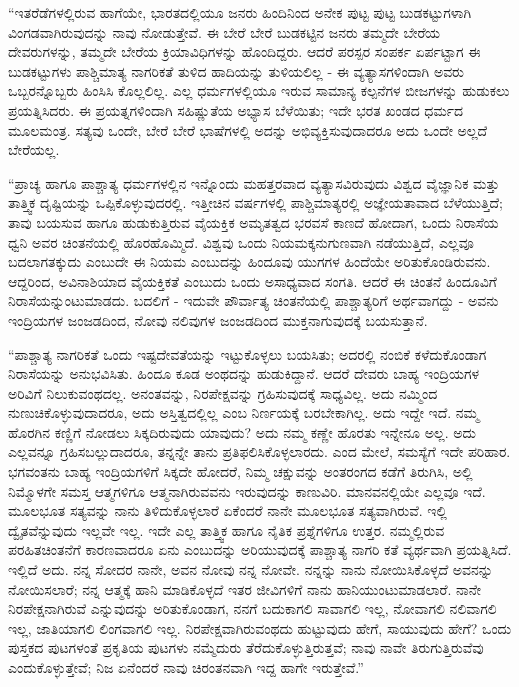 “ಇತರೆಡೆಗಳಲ್ಲಿರುವ ಹಾಗೆಯೇ, ಭಾರತದಲ್ಲಿಯೂ ಜನರು ಹಿಂದಿನಿಂದ ಅನೇಕ ಪುಟ್ಟ ಪುಟ್ಟ ಬುಡಕಟ್ಟುಗಳಾಗಿ ವಿಂಗಡವಾಗಿರುವುದನ್ನು ನಾವು ನೋಡುತ್ತೇವೆ. ಈ ಬೇರೆ ಬೇರೆ ಬುಡಕಟ್ಟಿನ ಜನರು ತಮ್ಮದೇ ಬೇರೆಯ ದೇವರುಗಳನ್ನು, ತಮ್ಮದೇ ಬೇರೆಯ ಕ್ರಿಯಾವಿಧಿಗಳನ್ನು ಹೊಂದಿದ್ದರು. ಆದರೆ ಪರಸ್ಪರ ಸಂಪರ್ಕ ಏರ್ಪಟ್ಟಾಗ ಈ ಬುಡಕಟ್ಟುಗಳು ಪಾಶ್ಚಿಮಾತ್ಯ ನಾಗರಿಕತೆ ತುಳಿದ ಹಾದಿಯನ್ನು ತುಳಿಯಲಿಲ್ಲ - ಈ ವ್ಯತ್ಯಾಸಗಳಿಂದಾಗಿ ಅವರು ಒಬ್ಬರನ್ನೊಬ್ಬರು ಹಿಂಸಿಸಿ ಕೊಲ್ಲಲಿಲ್ಲ. ಎಲ್ಲ ಧರ್ಮಗಳಲ್ಲಿಯೂ ಇರುವ ಸಾಮಾನ್ಯ ಕಲ್ಪನೆಗಳ ಬೀಜಗಳನ್ನು ಹುಡುಕಲು ಪ್ರಯತ್ನಿಸಿದರು. ಈ ಪ್ರಯತ್ನಗಳಿಂದಾಗಿ ಸಹಿಷ್ಣುತೆಯ ಅಭ್ಯಾಸ ಬೆಳೆಯಿತು; ಇದೇ ಭರತ ಖಂಡದ ಧರ್ಮದ ಮೂಲಮಂತ್ರ. ಸತ್ಯವು ಒಂದೇ, ಬೇರೆ ಬೇರೆ ಭಾಷೆಗಳಲ್ಲಿ ಅದನ್ನು ಅಭಿವ್ಯಕ್ತಿಸುವುದಾದರೂ ಅದು ಒಂದೇ ಅಲ್ಲದೆ ಬೇರೆಯಲ್ಲ.

“ಪ್ರಾಚ್ಯ ಹಾಗೂ ಪಾಶ್ಚಾತ್ಯ ಧರ್ಮಗಳಲ್ಲಿನ ಇನ್ನೊಂದು ಮಹತ್ತರವಾದ ವ್ಯತ್ಯಾಸವಿರುವುದು ವಿಶ್ವದ ವೈಜ್ಞಾನಿಕ ಮತ್ತು ತಾತ್ತ್ವಿಕ ದೃಷ್ಟಿಯನ್ನು ಒಪ್ಪಿಕೊಳ್ಳುವುದರಲ್ಲಿ. ಇತ್ತೀಚಿನ ವರ್ಷಗಳಲ್ಲಿ ಪಾಶ್ಚಿಮಾತ್ಯರಲ್ಲಿ ಅಜ್ಞೇಯತಾವಾದ ಬೆಳೆಯುತ್ತಿದೆ; ತಾವು ಬಯಸುವ ಹಾಗೂ ಹುಡುಕುತ್ತಿರುವ ವೈಯಕ್ತಿಕ ಅಮೃತತ್ವದ ಭರವಸೆ ಕಾಣದೆ ಹೋದಾಗ, ಒಂದು ನಿರಾಸೆಯ ಧ್ವನಿ ಅವರ ಚಿಂತನೆಯಲ್ಲಿ ಹೊರಹೊಮ್ಮಿದೆ. ವಿಶ್ವವು ಒಂದು ನಿಯಮಕ್ಕನುಗುಣವಾಗಿ ನಡೆಯುತ್ತಿದೆ, ಎಲ್ಲವೂ ಬದಲಾಗತಕ್ಕುದು ಎಂಬುದೇ ಈ ನಿಯಮ ಎಂಬುದನ್ನು ಹಿಂದೂವು ಯುಗಗಳ ಹಿಂದೆಯೇ ಅರಿತುಕೊಂಡಿರುವನು. ಆದ್ದರಿಂದ, ಅವಿನಾಶಿಯಾದ ವೈಯಕ್ತಿಕತೆ ಎಂಬುದು ಒಂದು ಅಸಾಧ್ಯವಾದ ಸಂಗತಿ. ಆದರೆ ಈ ಚಿಂತನೆ ಹಿಂದೂವಿಗೆ ನಿರಾಸೆಯನ್ನುಂಟುಮಾಡದು. ಬದಲಿಗೆ - ಇದುವೇ ಪೌರ್ವಾತ್ಯ ಚಿಂತನೆಯಲ್ಲಿ ಪಾಶ್ಚಾತ್ಯರಿಗೆ ಅರ್ಥವಾಗದ್ದು - ಅವನು ಇಂದ್ರಿಯಗಳ ಜಂಜಡದಿಂದ, ನೋವು ನಲಿವುಗಳ ಜಂಜಡದಿಂದ ಮುಕ್ತನಾಗುವುದಕ್ಕೆ ಬಯಸುತ್ತಾನೆ.

“ಪಾಶ್ಚಾತ್ಯ ನಾಗರಿಕತೆ ಒಂದು ಇಷ್ಟದೇವತೆಯನ್ನು ಇಟ್ಟುಕೊಳ್ಳಲು ಬಯಸಿತು; ಅದರಲ್ಲಿ ನಂಬಿಕೆ ಕಳೆದುಕೊಂಡಾಗ ನಿರಾಸೆಯನ್ನು ಅನುಭವಿಸಿತು. ಹಿಂದೂ ಕೂಡ ಅಂಥದನ್ನು ಹುಡುಕಿದ್ದಾನೆ. ಆದರೆ ದೇವರು ಬಾಹ್ಯ ಇಂದ್ರಿಯಗಳ ಅರಿವಿಗೆ ನಿಲುಕುವಂಥದಲ್ಲ. ಅನಂತವನ್ನು, ನಿರಪೇಕ್ಷವನ್ನು ಗ್ರಹಿಸುವುದಕ್ಕೆ ಸಾಧ್ಯವಿಲ್ಲ. ಅದು ನಮ್ಮಿಂದ ನುಣುಚಿಕೊಳ್ಳುವುದಾದರೂ, ಅದು ಅಸ್ತಿತ್ವದಲ್ಲಿಲ್ಲ ಎಂಬ ನಿರ್ಣಯಕ್ಕೆ ಬರಬೇಕಾಗಿಲ್ಲ. ಅದು ಇದ್ದೇ ಇದೆ. ನಮ್ಮ ಹೊರಗಿನ ಕಣ್ಣಿಗೆ ನೋಡಲು ಸಿಕ್ಕದಿರುವುದು ಯಾವುದು? ಅದು ನಮ್ಮ ಕಣ್ಣೇ ಹೊರತು ಇನ್ನೇನೂ ಅಲ್ಲ. ಅದು ಎಲ್ಲವನ್ನೂ ಗ್ರಹಿಸಬಲ್ಲುದಾದರೂ, ತನ್ನನ್ನೇ ತಾನು ಪ್ರತಿಫಲಿಸಿಕೊಳ್ಳಲಾರದು. ಎಂದ ಮೇಲೆ, ಸಮಸ್ಯೆಗೆ ಇದೇ ಪರಿಹಾರ. ಭಗವಂತನು ಬಾಹ್ಯ ಇಂದ್ರಿಯಗಳಿಗೆ ಸಿಕ್ಕದೇ ಹೋದರೆ, ನಿಮ್ಮ ಚಕ್ಷುವನ್ನು ಅಂತರಂಗದ ಕಡೆಗೆ ತಿರುಗಿಸಿ, ಅಲ್ಲಿ ನಿಮ್ಮೊಳಗೇ ಸಮಸ್ತ ಆತ್ಮಗಳಿಗೂ ಆತ್ಮನಾಗಿರುವವನು ಇರುವುದನ್ನು ಕಾಣುವಿರಿ. ಮಾನವನಲ್ಲಿಯೇ ಎಲ್ಲವೂ ಇದೆ. ಮೂಲಭೂತ ಸತ್ಯವನ್ನು ನಾನು ತಿಳಿದುಕೊಳ್ಳಲಾರೆ ಏಕೆಂದರೆ ನಾನೇ ಮೂಲಭೂತ ಸತ್ಯವಾಗಿರುವೆ. ಇಲ್ಲಿ ದ್ವೈತವೆನ್ನುವುದು ಇಲ್ಲವೇ ಇಲ್ಲ. ಇದೇ ಎಲ್ಲ ತಾತ್ತ್ವಿಕ ಹಾಗೂ ನೈತಿಕ ಪ್ರಶ್ನೆಗಳಿಗೂ ಉತ್ತರ. ನಮ್ಮಲ್ಲಿರುವ ಪರಹಿತಚಿಂತನೆಗೆ ಕಾರಣವಾದರೂ ಏನು ಎಂಬುದನ್ನು ಅರಿಯುವುದಕ್ಕೆ ಪಾಶ್ಚಾತ್ಯ ನಾಗರಿ ಕತೆ ವ್ಯರ್ಥವಾಗಿ ಪ್ರಯತ್ನಿಸಿದೆ. ಇಲ್ಲಿದೆ ಅದು. ನನ್ನ ಸೋದರ ನಾನೇ, ಅವನ ನೋವು ನನ್ನ ನೋವೇ. ನನ್ನನ್ನು ನಾನು ನೋಯಿಸಿಕೊಳ್ಳದೆ ಅವನನ್ನು ನೋಯಿಸಲಾರೆ; ನನ್ನ ಆತ್ಮಕ್ಕೆ ಹಾನಿ ಮಾಡಿಕೊಳ್ಳದೆ ಇತರ ಜೀವಿಗಳಿಗೆ ನಾನು ಹಾನಿಯುಂಟುಮಾಡಲಾರೆ. ನಾನೇ ನಿರಪೇಕ್ಷನಾಗಿರುವೆ ಎನ್ನುವುದನ್ನು ಅರಿತುಕೊಂಡಾಗ, ನನಗೆ ಬದುಕಾಗಲಿ ಸಾವಾಗಲಿ ಇಲ್ಲ, ನೋವಾಗಲಿ ನಲಿವಾಗಲಿ ಇಲ್ಲ, ಜಾತಿಯಾಗಲಿ ಲಿಂಗವಾಗಲಿ ಇಲ್ಲ. ನಿರಪೇಕ್ಷವಾಗಿರುವಂಥದು ಹುಟ್ಟುವುದು ಹೇಗೆ, ಸಾಯುವುದು ಹೇಗೆ? ಒಂದು ಪುಸ್ತಕದ ಪುಟಗಳಂತೆ ಪ್ರಕೃತಿಯ ಪುಟಗಳು ನಮ್ಮೆದುರು ತೆರೆದುಕೊಳ್ಳುತ್ತಿರುತ್ತವೆ; ನಾವು ನಾವೇ ತಿರುಗುತ್ತಿರುವೆವು ಎಂದುಕೊಳ್ಳುತ್ತೇವೆ; ನಿಜ ಏನೆಂದರೆ ನಾವು ಚಿರಂತನವಾಗಿ ಇದ್ದ ಹಾಗೇ ಇರುತ್ತೇವೆ.”

